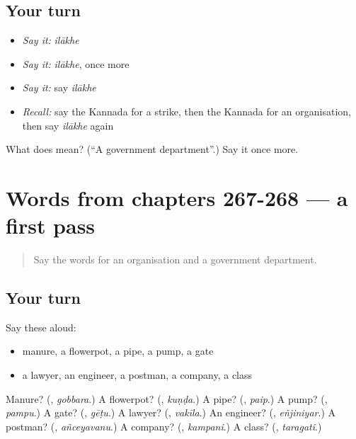 \subsection*{Your turn}
\begin{itemize}
\raggedright
  \item \emph{Say it:} \emph{ilākhe}
  \item \emph{Say it:} \emph{ilākhe}, once more
  \item \emph{Say it:} say \emph{ilākhe}
  \item \emph{Recall:} say the Kannada for a strike, then the Kannada for an organisation, then say \emph{ilākhe} again
\end{itemize}

\begin{tcolorbox}[breakable,colback=teal!4,colframe=teal!35!black,title={Before you move on}]
What does  mean? (\textquotedblleft{}A government department\textquotedblright{}.) Say it once more.
\end{tcolorbox}
\section[(dialogue)]{Words from chapters 267-268 — a first pass}

\label{lesson:KA-R271-first-pass-words-from-chapters-267-268}



\begin{quote}
Say the words for an organisation and a government department.
\end{quote}

\subsection*{Your turn}
Say these aloud:

\begin{itemize}
\raggedright
  \item manure, a flowerpot, a pipe, a pump, a gate
  \item a lawyer, an engineer, a postman, a company, a class
\end{itemize}

\begin{tcolorbox}[breakable,colback=teal!4,colframe=teal!35!black,title={Before you move on}]
Manure? (\textbf{}, \emph{gobbara}.) A flowerpot? (\textbf{}, \emph{kuṇḍa}.) A pipe? (\textbf{}, \emph{paip}.) A pump? (\textbf{}, \emph{pampu}.) A gate? (\textbf{}, \emph{gēṭu}.) A lawyer? (\textbf{}, \emph{vakīla}.) An engineer? (\textbf{}, \emph{eñjiniyar}.) A postman? (\textbf{}, \emph{añceyavanu}.) A company? (\textbf{}, \emph{kampani}.) A class? (\textbf{}, \emph{taragati}.)
\end{tcolorbox}
